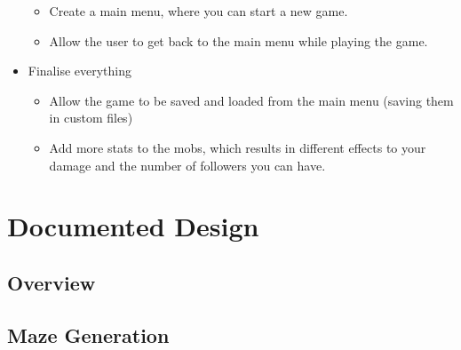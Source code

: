\documentclass{article}
\begin{document}
\begin{itemize}
\begin{itemize}
                        \item Create a main menu, where you can start a new game.
                        \item Allow the user to get back to the main menu while playing the game.
                    \end{itemize}
                \item Finalise everything
                    \begin{itemize}
                        \item Allow the game to be saved and loaded from the main menu (saving them in custom files)
                        \item Add more stats to the mobs, which results in different effects to your damage and the number of followers you can have.
                    \end{itemize}
            \end{itemize}
    \clearpage
    \section{Documented Design}
        \subsection{Overview} %
        \subsection{Maze Generation}
\end{document}
